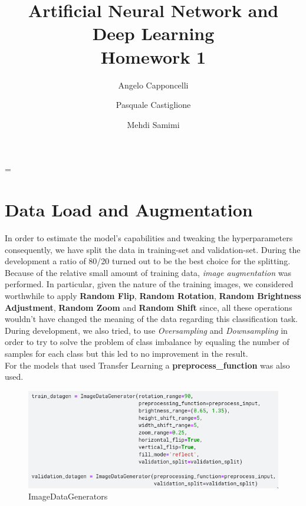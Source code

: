\documentclass[11pt]{article}
\title{
	\vspace{-2cm}
	\textbf{Artificial Neural Network and Deep Learning}\\
	\large Homework 1
}
\date{}
\author{Angelo Capponcelli \and Pasquale Castiglione \and Mehdi Samimi}
\newcommand{\justified}
{
	\tolerance=1
	\emergencystretch=\maxdimen
	\hyphenpenalty=10000
	\hbadness=10000
}
\begin{document}
\maketitle
\justified

\section*{Data Load and Augmentation}
In order to estimate the model's capabilities and tweaking the hyperparameters consequently, we have split the data in training-set and validation-set. During the development a ratio of 80/20 turned out to be the best choice for the splitting.\\
Because of the relative small amount of training data, \emph{image augmentation} was performed. In particular, given the nature of the training images, we considered worthwhile to apply \textbf{Random Flip}, \textbf{Random Rotation}, \textbf{Random Brightness Adjustment}, \textbf{Random Zoom} and \textbf{Random Shift} since, all these operations wouldn't have changed the meaning of the data regarding this classification task.\\
During development, we also tried, to use \emph{Oversampling} and \emph{Downsampling} in order to try to solve the problem of class imbalance by equaling the number of samples for each class but this led to no improvement in the result.\\
For the models that used Transfer Learning a  \textbf{preprocess\_function} was also used.

\begin{figure}[H]
\center
	\includegraphics[scale=0.4]{imageDataGenerator.png}
	\caption{ImageDataGenerators}
\end{figure}
\end{document}
